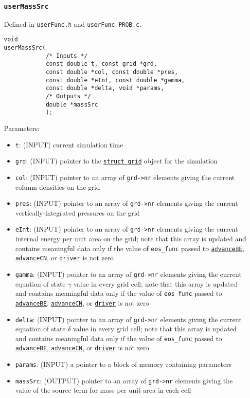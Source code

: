 \documentclass[12pt]{article}
\begin{document}
\subsubsection{\texttt{userMassSrc}}
\label{sssec:userMassSrc}

Defined in \verb=userFunc.h= and \verb=userFunc_PROB.c=.
\begin{verbatim}
void
userMassSrc(
            /* Inputs */
            const double t, const grid *grd,
            const double *col, const double *pres,
            const double *eInt, const double *gamma, 
            const double *delta, void *params, 
            /* Outputs */
            double *massSrc
            );
\end{verbatim}

Parameters:
\begin{itemize}
\item \texttt{t}: (INPUT) current simulation time
\item \texttt{grd}: (INPUT) pointer to the \hyperref[sssec:datastructures]{\texttt{struct grid}} object for the simulation
\item \texttt{col}: (INPUT) pointer to an array of \texttt{grd->nr} elements giving the current column densities on the grid
\item \texttt{pres}: (INPUT) pointer to an array of \texttt{grd->nr} elements giving the current vertically-integrated pressures on the grid
\item \texttt{eInt}: (INPUT) pointer to an array of \texttt{grd->nr} elements giving the current internal energy per unit area on the grid; note that this array is updated and contains meaningful data only if the value of \verb=eos_func= passed to \hyperref[sssec:advanceBE]{\texttt{advanceBE}}, \hyperref[sssec:advanceCN]{\texttt{advanceCN}}, or \hyperref[sssec:driver]{\texttt{driver}} is not zero
\item \texttt{gamma}: (INPUT) pointer to an array of \texttt{grd->nr} elements giving the current equation of state $\gamma$ value in every grid cell; note that this array is updated and contains meaningful data only if the value of \verb=eos_func= passed to \hyperref[sssec:advanceBE]{\texttt{advanceBE}}, \hyperref[sssec:advanceCN]{\texttt{advanceCN}}, or \hyperref[sssec:driver]{\texttt{driver}} is not zero
\item \texttt{delta}: (INPUT) pointer to an array of \texttt{grd->nr} elements giving the current equation of state $\delta$ value in every grid cell; note that this array is updated and contains meaningful data only if the value of \verb=eos_func= passed to \hyperref[sssec:advanceBE]{\texttt{advanceBE}}, \hyperref[sssec:advanceCN]{\texttt{advanceCN}}, or \hyperref[sssec:driver]{\texttt{driver}} is not zero
\item \texttt{params}: (INPUT) a pointer to a block of memory containing parameters
\item \texttt{massSrc}: (OUTPUT) pointer to an array of \texttt{grd->nr} elements giving the value of the source term for mass per unit area in each cell
\end{itemize}
\end{document}
